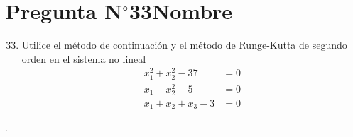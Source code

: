 \section{Pregunta N$^{\circ}$33\qquad Nombre}

\begin{frame}
	\begin{enumerate}\setcounter{enumi}{32}
		\item

		      Utilice el método de continuación y el método de
		      Runge-Kutta de segundo orden en el sistema no lineal
		      \begin{align*}
			      x^{2}_{1}+x^{2}_{2}-37 & =0 \\
			      x_{1}-x^2_{2}-5        & =0 \\
			      x_{1}+x_{2}+x_{3}-3    & =0
		      \end{align*}
	\end{enumerate}

	\begin{solution}
		.
	\end{solution}
\end{frame}